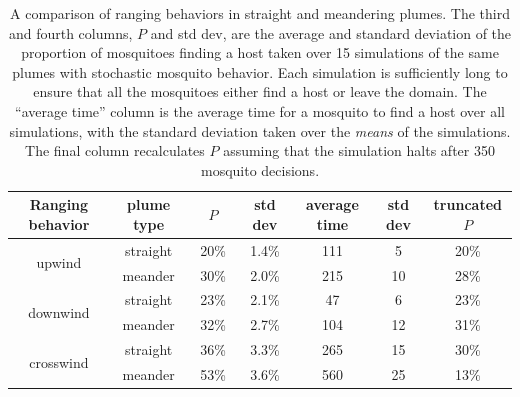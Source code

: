 \documentclass[12pt]{article}
\newcommand{\mycaption}[1]{\caption{#1}}
\begin{document}
		\begin{table}[hbtp]
			\begin{center}
				\mycaption{A comparison of ranging behaviors in straight and meandering plumes. The third and fourth columns, $P$ and std dev, are the average and standard deviation of the proportion of mosquitoes finding a host taken over 15 simulations of the same plumes with stochastic mosquito behavior. Each simulation is sufficiently long to ensure that all the mosquitoes either find a host or leave the domain. The ``average time'' column is the average time for a mosquito to find a host over all simulations, with the standard deviation taken over the \emph{means} of the simulations. The final column recalculates $P$ assuming that the simulation halts after 350 mosquito decisions.}
				\begin{tabular}{|c|c|c|c|c|c|c|}
					\hline
					Ranging behavior & plume type &$ \quad P \quad $& std dev & average time & std dev & truncated $P$\\
					\hline
					\multirow{2}{*}{upwind} & straight &20\% & 1.4\% & 111 & 5 & 20\%\\
												&  meander & 30\% & 2.0\% & 215 & 10 & 28\%\\
												\hline
					\multirow{2}{*}{downwind} & straight &23\% & 2.1\% & 47 & 6 & 23\%\\
												&  meander & 32\% & 2.7\% & 104 & 12 & 31\%\\
												\hline
					\multirow{2}{*}{crosswind} & straight &36\% & 3.3\% & 265 & 15 & 30\%\\
												&  meander & 53\% & 3.6\% & 560 & 25 & 13\%\\
					\hline
				\end{tabular}
				\label{tab:meander}
			\end{center}
		\end{table}
		
\end{document}
